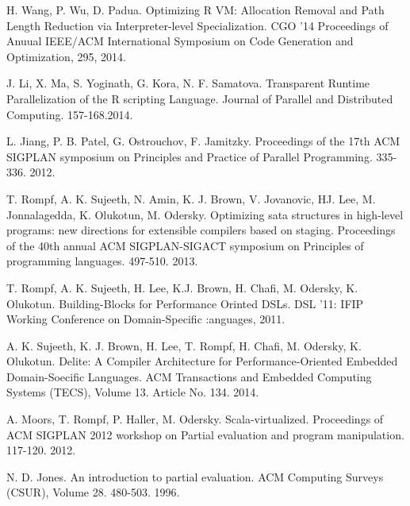 \documentclass{sigplanconf}
\begin{document}
\begin{thebibliography}{}
\bibitem[]{}
H. Wang, P. Wu, D. Padua. Optimizing R VM: Allocation Removal and Path Length Reduction via Interpreter-level Specialization. CGO '14 Proceedings of Anuual IEEE/ACM International Symposium on Code Generation and Optimization, 295, 2014.

\bibitem[]{}
J. Li, X. Ma, S. Yoginath, G. Kora, N. F. Samatova. Transparent Runtime Parallelization of the R scripting Language. Journal of Parallel and Distributed Computing. 157-168.2014.

\bibitem[]{}
L. Jiang, P. B. Patel, G. Ostrouchov, F. Jamitzky. Proceedings of the 17th ACM SIGPLAN symposium on Principles and Practice of Parallel Programming. 335-336. 2012.

\bibitem[]{}
T. Rompf, A. K. Sujeeth, N. Amin, K. J. Brown, V. Jovanovic, HJ. Lee, M. Jonnalagedda, K. Olukotun, M. Odersky. Optimizing sata structures in high-level programs: new directions for extensible compilers based on staging. Proceedings of the 40th annual ACM SIGPLAN-SIGACT symposium on Principles of programming languages. 497-510. 2013.

\bibitem[]{}
T. Rompf, A. K. Sujeeth, H. Lee, K.J. Brown, H. Chafi, M. Odersky, K. Olukotun. Building-Blocks for Performance Orinted DSLs. DSL '11: IFIP Working Conference on Domain-Specific :anguages, 2011.

\bibitem[]{}
A. K. Sujeeth, K. J. Brown, H. Lee, T. Rompf, H. Chafi, M. Odersky, K. Olukotun. Delite: A Compiler Architecture for Performance-Oriented Embedded Domain-Soecific Languages.  ACM Transactions and Embedded Computing Systems (TECS), Volume 13. Article No. 134. 2014.

\bibitem[]{}
A. Moors, T. Rompf, P. Haller, M. Odersky. Scala-virtualized. Proceedings of ACM SIGPLAN 2012 workshop on Partial evaluation and program manipulation. 117-120. 2012.

\bibitem[]{}
N. D. Jones. An introduction to partial evaluation. ACM Computing Surveys (CSUR), Volume 28. 480-503. 1996.

\end{thebibliography}
\end{document}
